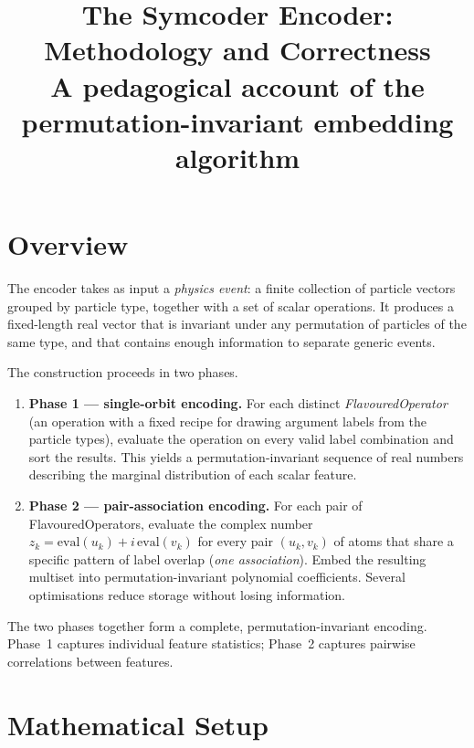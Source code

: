 \documentclass[11pt,a4paper]{article}
\title{\textbf{The Symcoder Encoder: Methodology and Correctness}\\
\large A pedagogical account of the permutation-invariant embedding algorithm}
\author{}
\date{}
\theoremstyle{definition}
\theoremstyle{plain}
\theoremstyle{remark}
\newcommand{\eval}{\mathrm{eval}}
\begin{document}
\maketitle
\tableofcontents
\newpage

\section{Overview}

The encoder takes as input a \emph{physics event}: a finite collection of
particle vectors grouped by particle type, together with a set of scalar
operations.  It produces a fixed-length real vector that is invariant under any
permutation of particles of the same type, and that contains enough information
to separate generic events.

The construction proceeds in two phases.
\begin{enumerate}
  \item \textbf{Phase 1 — single-orbit encoding.}  For each distinct
    \emph{FlavouredOperator} (an operation with a fixed recipe for drawing
    argument labels from the particle types), evaluate the operation on every
    valid label combination and sort the results.  This yields a
    permutation-invariant sequence of real numbers describing the marginal
    distribution of each scalar feature.

  \item \textbf{Phase 2 — pair-association encoding.}  For each pair of
    FlavouredOperators, evaluate the complex number $z_k = \eval(u_k) +
    i\,\eval(v_k)$ for every pair $(u_k,v_k)$ of atoms that share a specific
    pattern of label overlap (\emph{one association}).  Embed the resulting
    multiset into permutation-invariant polynomial coefficients.  Several
    optimisations reduce storage without losing information.
\end{enumerate}

The two phases together form a complete, permutation-invariant encoding.
Phase~1 captures individual feature statistics; Phase~2 captures pairwise
correlations between features.

\section{Mathematical Setup}
\end{document}
